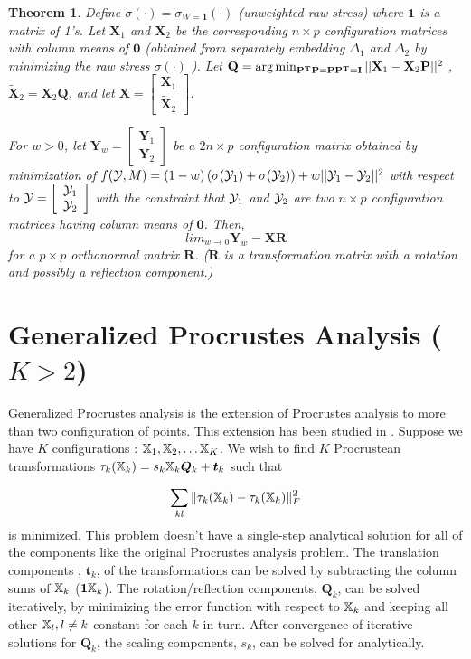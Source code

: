 \documentclass[12pt,oneside,final]{thesis}
\newtheorem{thm}{Theorem}
\begin{document}
\begin{thm}
Define $\sigma(\cdot)=\sigma_{W=\bm{1}}(\cdot)$ (unweighted raw stress) where $\bm{1}$ is a matrix of 1's.
 Let $\mathbf{X}_1$ and $\mathbf{X}_2$ be the corresponding $n\times p$ configuration matrices with column means of $\bm{0}$ (obtained from separately embedding  $\Delta_1$ and $\Delta_2$ by minimizing the raw stress $\sigma(\cdot)$ ). 
Let  $\mathbf{Q}=\arg\min_{\mathbf{P^T}\mathbf{P}=\mathbf{P}\mathbf{P^T}=\mathbf{I}}||{\mathbf{X}_1-\mathbf{X}_2}\mathbf{P}||^2$ ,   $\mathbf{\tilde{X}}_2= \mathbf{X}_2\mathbf{Q}$, 
and let  
$\mathbf{X}=\left[\begin{array}{c}
\mathbf{X}_1\\
\mathbf{\tilde{X}}_2
\end{array}\right]$.

For $w>0$, let $\mathbf{Y}_{w} = \left[\begin{array}{c}
\mathbf{Y}_1\\
\mathbf{Y}_2
\end{array}\right]$  be  a $2n \times p$ configuration matrix obtained by minimization of 
$ f(\mathcal{Y}, M) =(1-w)\left({\sigma{(\mathcal{Y}_1)}}+{\sigma{(\mathcal{Y}_2)}}\right)+w||{\mathcal{Y}_1-\mathcal{Y}_2}||^2 $ with respect to  $\mathcal{Y}=\left[\begin{array}{c}
\mathcal{Y}_1\\
\mathcal{Y}_2
\end{array}\right]$ with the constraint that $\mathcal{Y}_1$ and $\mathcal{Y}_2$ are two $n \times p$ configuration matrices having column means of $\bm{0}$. Then, $$lim_{w\rightarrow0}\mathbf{Y}_{w}=\mathbf{X}\mathbf{R}$$ for a $p\times p$ orthonormal matrix $\mathbf{R}$. ($\mathbf{R}$ is a transformation matrix with a rotation and possibly a reflection component.)
\end{thm}
 
\section{Generalized Procrustes Analysis ($K>2$) \label{sec:GenProcrustes}}
Generalized Procrustes analysis is the extension of Procrustes analysis to more than two configuration of points. This extension has been studied in \cite{GPCA}. Suppose we have $K$ configurations : $\mathbb{X}_1,\mathbb{X}_2,\ldots \mathbb{X}_K$. We wish to find $K$ Procrustean transformations  $\tau_k(\mathbb{X}_k)= s_k\mathbb{X}_k\bm{Q}_k+\bm{t}_{k}$ such that 

\[\sum_{kl}\|\tau_k(\mathbb{X}_k)-\tau_k(\mathbb{X}_k)\|^2_F\] is minimized. This problem doesn't have a single-step analytical solution  for all of the components like the original Procrustes analysis problem. The translation components , $\bm{t}_{k}$, of the transformations can be solved by subtracting the column sums of $\mathbb{X}_k$ ($\mbox{{\bf 1}}\mathbb{X}_k$). The rotation/reflection components, $\bm{Q}_k$, can be solved iteratively, by minimizing the error function with respect to $\mathbb{X}_k$ and keeping all other $\mathbb{X}_l, l \neq k$ constant for each $k$ in turn. After convergence of iterative solutions for $\bm{Q}_k$, the scaling components, $s_k$, can be solved for analytically.
\end{document}
